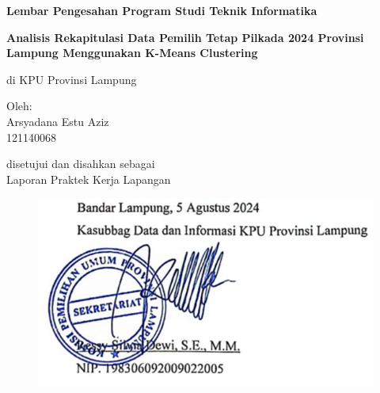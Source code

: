 \begin{center}
\large
\textbf{Lembar Pengesahan Program Studi Teknik Informatika}

\vspace{1cm}

\Large
\textbf{Analisis Rekapitulasi Data Pemilih Tetap Pilkada 2024 Provinsi Lampung Menggunakan K-Means Clustering}

\vspace{1cm}
\Large
di KPU Provinsi Lampung

\vspace{2cm}

Oleh: \\
Arsyadana Estu Aziz  \\
121140068

\vspace{2cm}

disetujui dan disahkan sebagai \\
Laporan Praktek Kerja Lapangan


\end{center}
\vfill



\begin{figure}[b]
    \includegraphics[width=0.5\linewidth]{images/signature_ressy.png}
    \label{fig:enter-label}
\end{figure}

\newpage